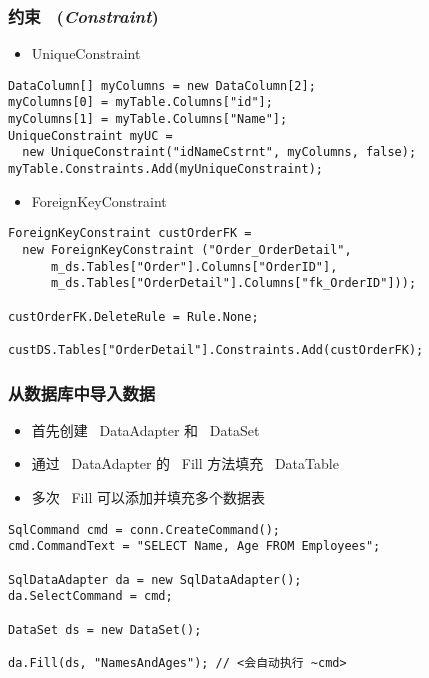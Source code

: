 \begin{frame}[fragile]
\frametitle{约束 ~(\textit{Constraint})}
\begin{itemize}
\item UniqueConstraint
\end{itemize}
\begin{lstlisting}
DataColumn[] myColumns = new DataColumn[2];
myColumns[0] = myTable.Columns["id"];
myColumns[1] = myTable.Columns["Name"];
UniqueConstraint myUC = 
  new UniqueConstraint("idNameCstrnt", myColumns, false);
myTable.Constraints.Add(myUniqueConstraint);
\end{lstlisting}
\begin{itemize}
\item ForeignKeyConstraint
\end{itemize}
\begin{lstlisting}
ForeignKeyConstraint custOrderFK = 
  new ForeignKeyConstraint ("Order_OrderDetail", 
      m_ds.Tables["Order"].Columns["OrderID"],       
      m_ds.Tables["OrderDetail"].Columns["fk_OrderID"]));

custOrderFK.DeleteRule = Rule.None;

custDS.Tables["OrderDetail"].Constraints.Add(custOrderFK); 
\end{lstlisting}
\end{frame}

\begin{frame}[fragile]
\frametitle{从数据库中导入数据}
\begin{itemize}
\item 首先创建 ~DataAdapter 和 ~DataSet
\item 通过 ~DataAdapter 的 ~Fill 方法填充 ~DataTable
\item 多次 ~Fill 可以添加并填充多个数据表
\end{itemize}
\begin{lstlisting}[escapeinside=<>]
SqlCommand cmd = conn.CreateCommand();
cmd.CommandText = "SELECT Name, Age FROM Employees";

SqlDataAdapter da = new SqlDataAdapter();
da.SelectCommand = cmd;

DataSet ds = new DataSet();

da.Fill(ds, "NamesAndAges"); // <会自动执行 ~cmd>
\end{lstlisting}
\end{frame}

